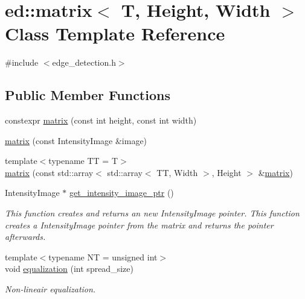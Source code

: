 \hypertarget{classed_1_1matrix}{}\section{ed\+:\+:matrix$<$ T, Height, Width $>$ Class Template Reference}
\label{classed_1_1matrix}


{\ttfamily \#include $<$edge\+\_\+detection.\+h$>$}

\subsection*{Public Member Functions}
\begin{DoxyCompactItemize}
\item 
constexpr \mbox{\hyperlink{classed_1_1matrix_a41874c674fa70fc0d6e6f3cce1825cfe}{matrix}} (const int height, const int width)
\item 
\mbox{\hyperlink{classed_1_1matrix_ac61570a638973eb5377cbca411ab9492}{matrix}} (const Intensity\+Image \&image)
\item 
{\footnotesize template$<$typename TT  = T$>$ }\\\mbox{\hyperlink{classed_1_1matrix_a96f0856011866bbcf92521bbf5ef9dd3}{matrix}} (const std\+::array$<$ std\+::array$<$ TT, Width $>$, Height $>$ \&\mbox{\hyperlink{classed_1_1matrix}{matrix}})
\item 
Intensity\+Image $\ast$ \mbox{\hyperlink{classed_1_1matrix_a2adb72ad2c0829cf6efc33d6984308e6}{get\+\_\+intensity\+\_\+image\+\_\+ptr}} ()
\begin{DoxyCompactList}\small\item\em This function creates and returns an new Intensity\+Image pointer. This function creates a Intensity\+Image pointer from the matrix and returns the pointer afterwards. \end{DoxyCompactList}\item 
{\footnotesize template$<$typename NT  = unsigned int$>$ }\\void \mbox{\hyperlink{classed_1_1matrix_a49e7d0658023caeafc6cf25385b74872}{equalization}} (int spread\+\_\+size)
\begin{DoxyCompactList}\small\item\em Non-\/lineair equalization. \end{DoxyCompactList}\item 
\mbox{\label{classed_1_1matrix_a9188ac4fe9ddc17b80e9b7865f3efe12}} 

\end{DoxyCompactItemize}
